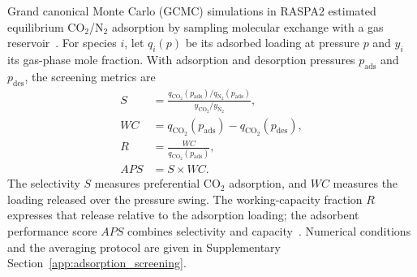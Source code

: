 \documentclass[a5paper, 10pt]{article}
\begin{document}
Grand canonical Monte Carlo (GCMC) simulations in RASPA2 estimated equilibrium CO$_2$/N$_2$ adsorption by sampling molecular exchange with a gas reservoir~\cite{dubbeldam2016raspa,altintas2018database}. For species $i$, let $q_i(p)$ be its adsorbed loading at pressure $p$ and $y_i$ its gas-phase mole fraction. With adsorption and desorption pressures $p_{\mathrm{ads}}$ and $p_{\mathrm{des}}$, the screening metrics are
\begin{equation}
\label{eq:co2_metrics}
\begin{aligned}
S &= \frac{q_{\mathrm{CO_2}}(p_{\mathrm{ads}})/q_{\mathrm{N_2}}(p_{\mathrm{ads}})}{y_{\mathrm{CO_2}}/y_{\mathrm{N_2}}},\\
WC &= q_{\mathrm{CO_2}}(p_{\mathrm{ads}})-q_{\mathrm{CO_2}}(p_{\mathrm{des}}),\\
R &= \frac{WC}{q_{\mathrm{CO_2}}(p_{\mathrm{ads}})},\\
APS &= S\times WC.
\end{aligned}
\end{equation}
The selectivity $S$ measures preferential CO$_2$ adsorption, and $WC$ measures the loading released over the pressure swing. The working-capacity fraction $R$ expresses that release relative to the adsorption loading; the adsorbent performance score $APS$ combines selectivity and capacity~\cite{altintas2018database,avci2018high}. Numerical conditions and the averaging protocol are given in Supplementary Section~\ref{app:adsorption_screening}.
\end{document}
